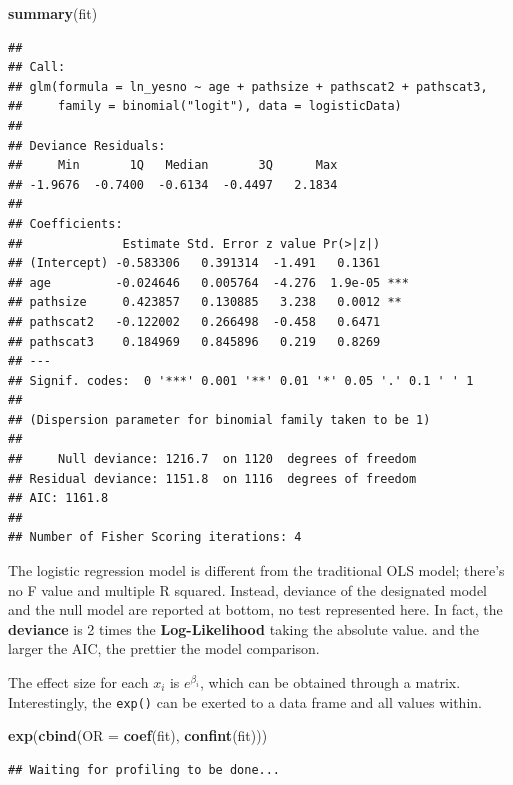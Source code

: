 \documentclass[
]{ctexart}
\newenvironment{Shaded}{\begin{snugshade}}{\end{snugshade}}
\newcommand{\AttributeTok}[1]{\textcolor[rgb]{0.13,0.29,0.53}{#1}}
\newcommand{\FunctionTok}[1]{\textcolor[rgb]{0.13,0.29,0.53}{\textbf{#1}}}
\newcommand{\NormalTok}[1]{#1}
\begin{document}
\begin{Shaded}
\begin{Highlighting}[]
\FunctionTok{summary}\NormalTok{(fit)}
\end{Highlighting}
\end{Shaded}

\begin{verbatim}
## 
## Call:
## glm(formula = ln_yesno ~ age + pathsize + pathscat2 + pathscat3, 
##     family = binomial("logit"), data = logisticData)
## 
## Deviance Residuals: 
##     Min       1Q   Median       3Q      Max  
## -1.9676  -0.7400  -0.6134  -0.4497   2.1834  
## 
## Coefficients:
##              Estimate Std. Error z value Pr(>|z|)    
## (Intercept) -0.583306   0.391314  -1.491   0.1361    
## age         -0.024646   0.005764  -4.276  1.9e-05 ***
## pathsize     0.423857   0.130885   3.238   0.0012 ** 
## pathscat2   -0.122002   0.266498  -0.458   0.6471    
## pathscat3    0.184969   0.845896   0.219   0.8269    
## ---
## Signif. codes:  0 '***' 0.001 '**' 0.01 '*' 0.05 '.' 0.1 ' ' 1
## 
## (Dispersion parameter for binomial family taken to be 1)
## 
##     Null deviance: 1216.7  on 1120  degrees of freedom
## Residual deviance: 1151.8  on 1116  degrees of freedom
## AIC: 1161.8
## 
## Number of Fisher Scoring iterations: 4
\end{verbatim}

The logistic regression model is different from the traditional OLS
model; there's no F value and multiple R squared. Instead, deviance of
the designated model and the null model are reported at bottom, no test
represented here. In fact, the \textbf{deviance} is 2 times the
\textbf{Log-Likelihood} taking the absolute value. and the larger the
AIC, the prettier the model comparison.

The effect size for each \(x_i\) is \(e^{\beta_i}\), which can be
obtained through a matrix. Interestingly, the \texttt{exp()} can be
exerted to a data frame and all values within.

\begin{Shaded}
\begin{Highlighting}[]
\FunctionTok{exp}\NormalTok{(}\FunctionTok{cbind}\NormalTok{(}\AttributeTok{OR =} \FunctionTok{coef}\NormalTok{(fit), }\FunctionTok{confint}\NormalTok{(fit)))}
\end{Highlighting}
\end{Shaded}

\begin{verbatim}
## Waiting for profiling to be done...
\end{verbatim}
\end{document}
